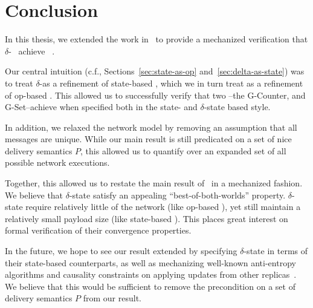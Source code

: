\chapter{Conclusion}
\label{chap:conclusion}

In this thesis, we extended the work in~\citet{gomes17} to provide a mechanized
verification that $\delta$-\CRDTs~\citep{almedia18} achieve
\SEC~\citep{shapiro11}.

Our central intuition (c.f., Sections~\ref{sec:state-as-op}
and~\ref{sec:delta-as-state}) was to treat $\delta$-\CRDTs as a refinement of
state-based \CRDTs, which we in turn treat as a refinement of op-based \CRDTs.
This allowed us to successfully verify that two \CRDTs--the G-Counter, and
G-Set--achieve \SEC when specified both in the state- and $\delta$-state based
style.

In addition, we relaxed the network model by removing an assumption that all
messages are unique. While our main result is still predicated on a set of nice
delivery semantics $P$, this allowed us to quantify over an expanded set of all
possible network executions.

Together, this allowed us to restate the main result of~\citet{almedia18} in a
mechanized fashion. We believe that $\delta$-state \CRDTs satisfy an appealing
``best-of-both-worlds'' property. $\delta$-state \CRDTs require relatively
little of the network (like op-based \CRDTs), yet still maintain a relatively
small payload size (like state-based \CRDTs). This places great interest on
formal verification of their convergence properties.

In the future, we hope to see our result extended by specifying $\delta$-state
\CRDTs in terms of their state-based counterparts, as well as mechanizing
well-known anti-entropy algorithms and causality constraints on applying updates
from other replicas~\citep{almedia18}. We believe that this would be sufficient
to remove the precondition on a set of delivery semantics $P$ from our result.
